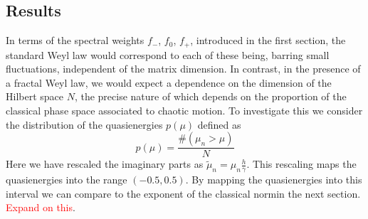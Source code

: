 \documentclass{iopart}
\begin{document}
\subsection{Results}

In terms of the spectral weights $f_{-}$, $f_{0}$, $f_{+}$, introduced in the first section, the standard Weyl law would correspond to each of these being, barring small fluctuations, independent of the matrix dimension. In contrast, in the presence of a fractal Weyl law, we would expect a dependence on the dimension of the Hilbert space $N$, the precise nature of which depends on the proportion of the classical phase space associated to chaotic motion. To investigate this we consider the distribution of the quasienergies $p(\mu)$ defined as 
\begin{equation}
	p(\mu)=\frac{\# (\mu_n>\mu)}{N}
\end{equation}
Here we have rescaled the imaginary parts as $\tilde{\mu}_n=\mu_n\frac{h}{\gamma}$. This rescaling maps the quasienergies into the range $(-0.5,0.5)$. By mapping the quasienergies into this interval we can compare to the exponent of the classical normin the next section. \textcolor{red}{Expand on this}.  
\end{document}
